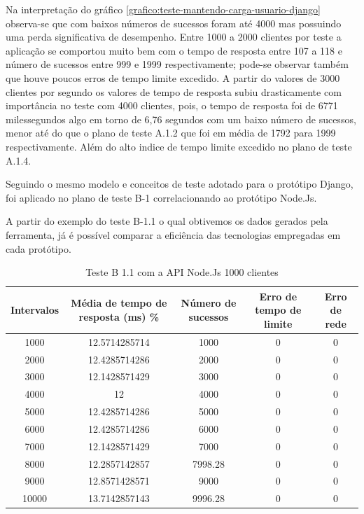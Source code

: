   Na interpretação do gráfico \ref{grafico:teste-mantendo-carga-usuario-django}  observa-se que com baixos números de sucessos foram 
  até 4000 mas possuindo uma perda significativa de desempenho. Entre 1000 a 2000 clientes por teste a aplicação se comportou muito bem
  com o tempo de resposta entre 107 a 118 e número de sucessos entre 999 e 1999 respectivamente; pode-se observar também que houve poucos
  erros de tempo limite excedido. A partir do valores de 3000 clientes por segundo os valores de tempo de resposta subiu drasticamente
  com importância no teste com 4000 clientes, pois, o tempo de resposta foi de 6771 milessegundos algo em torno de 6,76 segundos com um 
  baixo número de sucessos, menor até do que o plano de teste A.1.2 que foi em média de 1792 para 1999 respectivamente. Além do alto indice
  de tempo limite excedido no plano de teste A.1.4.
  
  Seguindo o mesmo modelo e conceitos de teste adotado para o protótipo Django, foi aplicado no plano de teste 
  B-1 correlacionando ao protótipo Node.Js. 
  
  A partir do exemplo do teste B-1.1 o qual obtivemos os dados gerados pela ferramenta, já é possível comparar a eficiência das 
  tecnologias empregadas em cada protótipo.
  
  \begin{table}[H]
    \centering
    \footnotesize
    \setlength{\abovecaptionskip}{0pt}
    \setlength{\belowcaptionskip}{0pt}
    \caption[Teste B-1.1 com a API 1000 clientes]{Teste B 1.1 com a API Node.Js 1000 clientes}
    \label{tab:teste-b-1-1}
    \begin{tabular}{c|c|c|c|c}
      \hline \hline
      Intervalos  & 	Média de tempo de resposta (ms) \% &	Número de sucessos & 	Erro de tempo de limite &	Erro de rede \\ 
      \hline \hline
      1000 &		12.5714285714 &				1000 & 				0 &				0 \\
      2000 &		12.4285714286 &				2000 & 				0 &				0 \\
      3000 &		12.1428571429 &				3000 & 				0 &				0 \\
      4000 &		12 &					4000 & 				0 &				0 \\
      5000 &		12.4285714286 &				5000 & 				0 &				0 \\
      6000 &		12.4285714286 &				6000 & 				0 &				0 \\
      7000 &		12.1428571429 &				7000 & 				0 &				0 \\
      8000 &		12.2857142857 &				7998.28 & 			0 &				0 \\
      9000 &		12.8571428571 &				9000 & 				0 &				0 \\
      10000 &		13.7142857143 &				9996.28 &		 	0 &				0 \\
      \hline \hline
    \end{tabular}
  \end{table}
  
